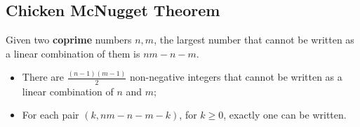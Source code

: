 \subsection{Chicken McNugget Theorem}

Given two \textbf{coprime} numbers $n, m$, the largest number that cannot be written as a linear combination of them is $nm - n - m$.

\begin{itemize}
    \item There are $\frac{(n-1)(m-1)}{2}$ non-negative integers that cannot be written as a linear combination of $n$ and $m$;
    \item For each pair $(k, nm - n - m - k)$, for $k \geq 0$, exactly one can be written.
\end{itemize}
